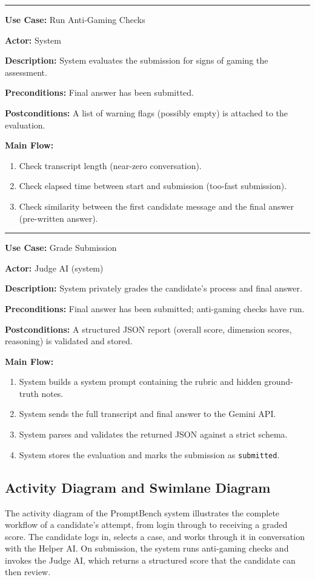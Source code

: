 \documentclass[11pt]{article}
\newcommand{\ucbox}[6]{%
  \noindent\rule{\linewidth}{0.5pt}\par
  \textbf{Use Case:} #1\par
  \textbf{Actor:} #2\par
  \textbf{Description:} #3\par
  \textbf{Preconditions:} #4\par
  \textbf{Postconditions:} #5\par
  \textbf{Main Flow:}\par
  #6
}
\begin{document}
\vspace{0.3cm}
\ucbox{Run Anti-Gaming Checks}{System}
{System evaluates the submission for signs of gaming the assessment.}
{Final answer has been submitted.}
{A list of warning flags (possibly empty) is attached to the evaluation.}
{
\begin{enumerate}[nosep]
  \item Check transcript length (near-zero conversation).
  \item Check elapsed time between start and submission (too-fast submission).
  \item Check similarity between the first candidate message and the final answer (pre-written answer).
\end{enumerate}
}

\vspace{0.3cm}
\ucbox{Grade Submission}{Judge AI (system)}
{System privately grades the candidate's process and final answer.}
{Final answer has been submitted; anti-gaming checks have run.}
{A structured JSON report (overall score, dimension scores, reasoning) is validated and stored.}
{
\begin{enumerate}[nosep]
  \item System builds a system prompt containing the rubric and hidden ground-truth notes.
  \item System sends the full transcript and final answer to the Gemini API.
  \item System parses and validates the returned JSON against a strict schema.
  \item System stores the evaluation and marks the submission as \texttt{submitted}.
\end{enumerate}
}

\newpage
\subsection{Activity Diagram and Swimlane Diagram}

The activity diagram of the PromptBench system illustrates the complete workflow of a
candidate's attempt, from login through to receiving a graded score. The candidate logs in,
selects a case, and works through it in conversation with the Helper AI. On submission, the
system runs anti-gaming checks and invokes the Judge AI, which returns a structured score
that the candidate can then review.
\end{document}
